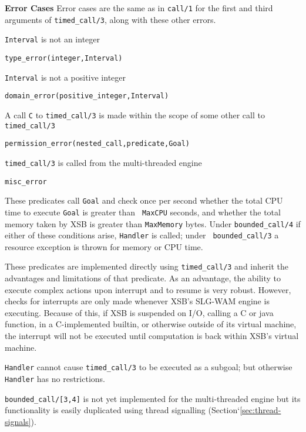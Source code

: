 \begin{description}
{\bf Error Cases} 
%
Error cases are the same as in {\tt call/1} for the first and third
arguments of {\tt timed\_call/3}, along with these other errors.
%
\begin{description}
\item {\tt Interval} is not an integer
\bi
\item {\tt type\_error(integer,Interval)}
\ei
\item {\tt Interval} is not a positive integer
\bi
\item {\tt domain\_error(positive\_integer,Interval)}
\ei
\item A call {\tt C} to {\tt timed\_call/3} is made within the scope
  of some other call to {\tt timed\_call/3}
%
\bi
\item {\tt permission\_error(nested\_call,predicate,{\tt Goal})}
\ei
\item {\tt timed\_call/3} is called from the multi-threaded engine
\bi
\item {\tt misc\_error}
\ei
\end{description}

%
These predicates call {\tt Goal} and check once per second
whether the total CPU time to execute {\tt Goal} is greater than {\tt
  MaxCPU} seconds, and whether the total memory taken by XSB is
greater than {\tt MaxMemory} bytes.  Under {\tt bounded\_call/4} if
either of these conditions arise, {\tt Handler} is called; under {\tt
  bounded\_call/3} a resource exception is thrown for memory or CPU
time.  

These predicates are implemented directly using {\tt timed\_call/3}
and inherit the advantages and limitations of that predicate.  As an
advantage, the ability to execute complex actions upon interrupt and
to resume is very robust.  However, checks for interrupts are only
made whenever XSB's SLG-WAM engine is executing.  Because of this, if
XSB is suspended on I/O, calling a C or java function, in a
C-implemented builtin, or otherwise outside of its virtual machine,
the interrupt will not be executed until computation is back within
XSB's virtual machine.

{\tt Handler} cannot cause {\tt timed\_call/3} to be executed as a
subgoal; but otherwise {\tt Handler} has no restrictions.

{\tt bounded\_call/[3,4]} is not yet implemented for the
multi-threaded engine but its functionality is easily duplicated using
thread signalling (Section`\ref{sec:thread-signals}).


\end{description}
